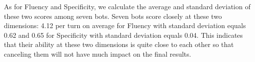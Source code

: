 As for Fluency and Specificity, 
we calculate the average and 
standard deviation 
of these two scores
among seven bots.
Seven bots score 
closely 
at these two dimensions: 
4.12 per turn on average for Fluency with standard deviation equals 0.62 
and 0.65 for Specificity with standard deviation equals 0.04. This indicates that their ability at these two dimensions is quite close to each other so that canceling them will not have much impact on the final results.


